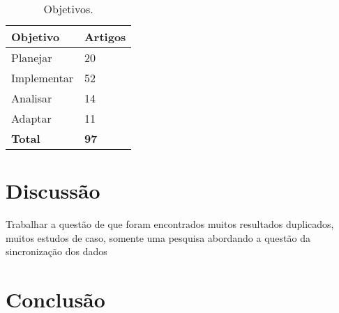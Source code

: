 \documentclass[
article,			%
11pt,				%
oneside,			%
a4paper,			%
english,			%
brazil,				%
sumario=tradicional
]{abntex2}
\begin{document}
  \begin{table}[htb]
    \ABNTEXfontereduzida
    \caption[Objetivos]{Objetivos.}
    \label{tab-para}
    \begin{center}
      \begin{tabular}{p{3.0cm}|p{2.0cm}}
        \textbf{Objetivo} & \textbf{Artigos} \\
        \hline
        Planejar & 20 \\
        \hline
        Implementar & 52 \\
        \hline
        Analisar & 14 \\
        \hline
        Adaptar & 11 \\
        \hline
        \textbf{Total} & \textbf{97} \\
      \end{tabular}
    \end{center}
  \end{table}

  \section{Discussão}

  Trabalhar a questão de que foram encontrados muitos resultados duplicados, muitos estudos de caso, somente uma pesquisa abordando a questão da sincronização dos dados


  \section{Conclusão}


  \postextual



  \emptythanks
  \maketitle
\end{document}
